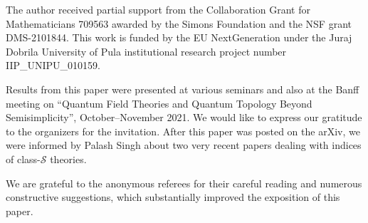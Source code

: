 \documentclass[pdftex]{sigma}
\numberwithin{equation}{section}
\theoremstyle{definition}
\begin{document}
The author received partial support from the Collaboration Grant for Mathematicians 709563 awarded by the Simons Foundation and the NSF grant DMS-2101844.
This work is funded by the EU NextGeneration under the Juraj Dobrila University
of Pula institutional research project number IIP\_{}UNIPU\_{}010159.

 Results from this paper were presented at various seminars and also at the Banff meeting on ``Quantum Field Theories and Quantum Topology Beyond Semisimplicity'',
 October--November 2021. We would like to express our gratitude to the organizers for the invitation. After this paper was posted on the arXiv, we were informed by Palash Singh about two very recent papers
\cite{Beem-new, Pan} dealing with indices of class-$\mathcal{S}$ theories.


We are grateful to the anonymous referees for their careful reading and numerous constructive suggestions, which substantially improved the exposition of this paper.

\end{document}
